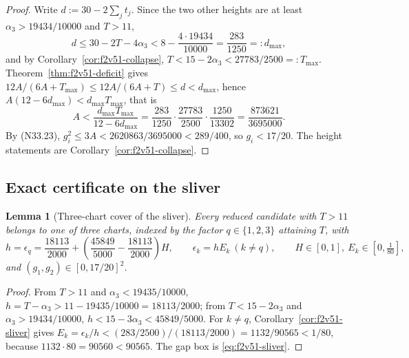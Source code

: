 \documentclass[11pt]{article}
\newtheorem{lemma}[theorem]{Lemma}
\theoremstyle{definition}
\theoremstyle{remark}
\begin{document}
\begin{proof}
Write \(d:=30-2\sum_jt_j\).  Since the two other heights are at least
\(\alpha_3>19434/10000\) and \(T>11\),
\[
 d\le30-2T-4\alpha_3<8-\frac{4\cdot19434}{10000}=\frac{283}{1250}=:d_{\max},
\]
and by Corollary~\ref{cor:f2v51-collapse},
\(T<15-2\alpha_3<27783/2500=:T_{\max}\).
Theorem~\ref{thm:f2v51-deficit} gives
\(12A/(6A+T_{\max})\le12A/(6A+T)\le d<d_{\max}\), hence
\(A(12-6d_{\max})<d_{\max}T_{\max}\), that is
\[
 A<\frac{d_{\max}T_{\max}}{12-6d_{\max}}
 =\frac{283}{1250}\cdot\frac{27783}{2500}\cdot\frac{1250}{13302}
 =\frac{873621}{3695000}.
\]
By \textup{(N33.23)}, \(g_i^2\le3A<2620863/3695000<289/400\), so
\(g_i<17/20\).  The height statements are
Corollary~\ref{cor:f2v51-collapse}.
\end{proof}

\subsection{Exact certificate on the sliver}

\begin{lemma}[Three-chart cover of the sliver]
\label{lem:f2v51-cover}
Every reduced candidate with \(T>11\) belongs to one of three charts,
indexed by the factor \(q\in\{1,2,3\}\) attaining \(T\), with
\begin{equation}
 h=\epsilon_q=\frac{18113}{2000}
   +\left(\frac{45849}{5000}-\frac{18113}{2000}\right)H,
 \qquad
 \epsilon_k=hE_k\ (k\ne q),
 \qquad
 H\in[0,1],\ E_k\in\left[0,\tfrac1{80}\right],
 \label{eq:f2v51-chart}
\end{equation}
and \((g_1,g_2)\in[0,17/20]^2\).
\end{lemma}

\begin{proof}
From \(T>11\) and \(\alpha_3<19435/10000\),
\(h=T-\alpha_3>11-19435/10000=18113/2000\); from
\(T<15-2\alpha_3\) and \(\alpha_3>19434/10000\),
\(h<15-3\alpha_3<45849/5000\).  For \(k\ne q\),
Corollary~\ref{cor:f2v51-sliver} gives
\(E_k=\epsilon_k/h<(283/2500)/(18113/2000)=1132/90565<1/80\), because
\(1132\cdot80=90560<90565\).  The gap box is
\eqref{eq:f2v51-sliver}.
\end{proof}
\end{document}
